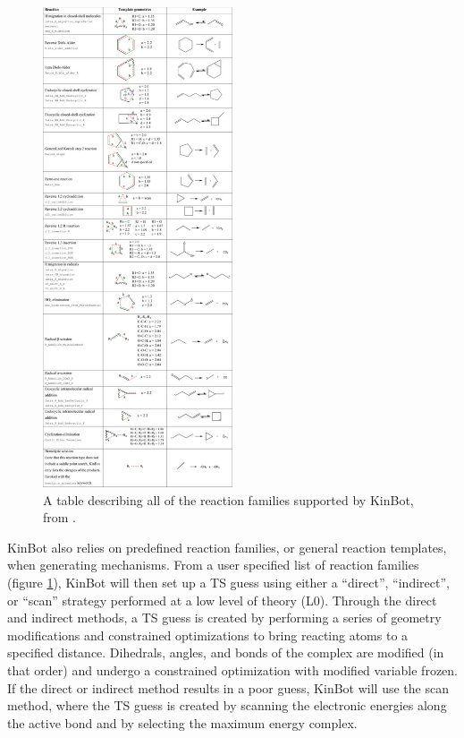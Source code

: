 \documentclass[preprint, 11pt]{elsarticle} %
\begin{document}
\begin{figure}
    \centering
    \includegraphics[width=0.5\textwidth]{kinbot_reactions}
    \caption{A table describing all of the reaction families supported by KinBot,  from \cite{kinbot:2019}.}
    \label{fig:kinbot_families}
\end{figure}

KinBot also relies on predefined reaction families, or general reaction templates, when generating mechanisms. 
From a user specified list of reaction families (figure \ref{fig:kinbot_families}), KinBot will then set up a TS guess using either a ``direct'', ``indirect'', or ``scan'' strategy performed at a low level of theory (L0).
Through the direct and indirect methods, a TS guess is created by performing a series of geometry modifications and constrained optimizations to bring reacting atoms to a specified distance. 
Dihedrals, angles, and bonds of the complex are modified (in that order) and undergo a constrained optimization with modified variable frozen.
If the direct or indirect method results in a poor guess, KinBot will use the scan method, where the TS guess is created by scanning the electronic energies along the active bond and by selecting the maximum energy complex.
\end{document}
